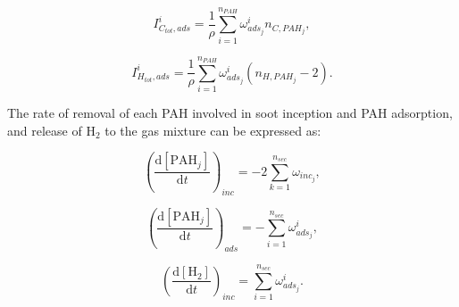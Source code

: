 \begin{equation}
	I^i_{C_{tot},ads} =
	\frac{1}{\rho}
	\sum_{i=1}^{n_{PAH}}
	\omega^i_{ads_j}
	n_{C,PAH_j}
	\label{eqn:ICtotads_ebri},
\end{equation}

\begin{equation}
	I^i_{H_{tot},ads} =
	\frac{1}{\rho}
	\sum_{i=1}^{n_{PAH}}
	\omega^i_{ads_j}
	\left(n_{H,PAH_j}-2\right)
	\label{eqn:IHtotads_ebri}.
\end{equation}

The rate of removal of each PAH involved in soot inception and PAH adsorption, and release of $\mathrm{H_2}$ to the gas mixture can be expressed as:

\begin{equation}
	\left(
	\frac{\mathrm{d}\left[{\mathrm{PAH}_j}\right]}{\mathrm{d}t}
	\right)_{inc}
	= 
	-2\sum_{k=1}^{n_{sec}}\omega_{inc_{j}},
\end{equation}

\begin{equation}
	\left(
	\frac{\mathrm{d}\left[{\mathrm{PAH}_j}\right]}{\mathrm{d}t}
	\right)_{ads}
	= 
	-\sum_{i=1}^{n_{sec}}\omega^i_{ads_j},
	\label{eqn:PAHscrub_ebri_ads}
\end{equation}

\begin{equation}
	\left(
	\frac{\mathrm{d}\left[{\mathrm{H_2}}\right]}{\mathrm{d}t}
	\right)_{inc}
	= 
	\sum_{i=1}^{n_{sec}}\omega^i_{ads_j}.
	\label{eqn:H2scrub_ebri}
\end{equation}
